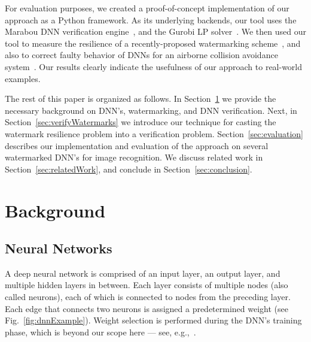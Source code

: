 \documentclass{easychair}
\begin{document}
For evaluation purposes, we created a proof-of-concept implementation
of our approach as a Python framework. As its underlying backends, our
tool uses the Marabou DNN verification
engine~\cite{KaHuIbJuLaLiShThWuZeDiKoBa19Marabou}, and the Gurobi LP
solver~\cite{gurobi}. We then used our tool to measure the resilience
of a recently-proposed watermarking
scheme~\cite{AdBaPiKeWatermarking}, and also to correct faulty
behavior of DNNs for an airborne collision avoidance
system~\cite{JuLoBrOwKo16,KaBaDiJuKo17Reluplex}. Our results clearly
indicate the usefulness of our approach to real-world examples.

The rest of this paper is organized as follows. In
Section~\ref{sec:background} we provide the necessary background on
DNN's, watermarking, and DNN verification. Next, in
Section~\ref{sec:verifyWatermarks} we introduce our technique for
casting the watermark resilience problem into a verification
problem. Section~\ref{sec:evaluation} describes our implementation and
evaluation of the approach on several watermarked DNN's for image
recognition. We discuss related work in Section~\ref{sec:relatedWork},
and conclude in Section~\ref{sec:conclusion}.

\section{Background}
\label{sec:background}

\subsection{Neural Networks}
A deep neural network is comprised of an input layer, an output layer,
and multiple hidden layers in between. Each layer consists of multiple
nodes (also called neurons), each of which is connected to nodes from
the preceding layer. Each edge that connects two neurons is assigned a
predetermined weight (see Fig.~\ref{fig:dnnExample}). Weight selection
is performed during the DNN's training phase, which is beyond our
scope here --- see, e.g.,~\cite{FoBeCu16}. 
\end{document}
